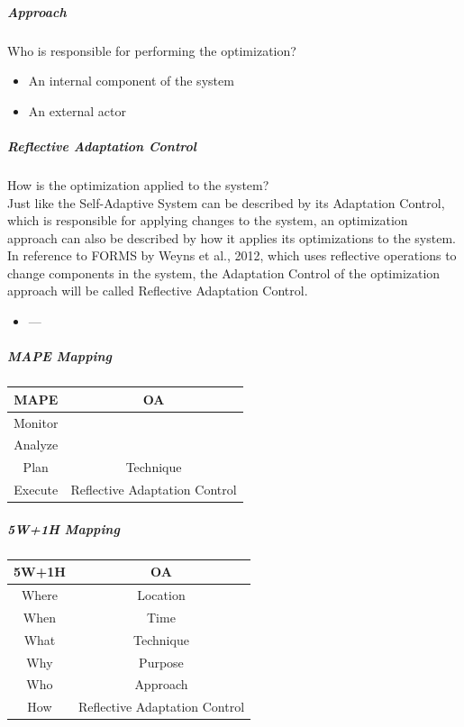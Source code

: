 \subparagraph*{Approach}
Who is responsible for performing the optimization? \\
\begin{itemize}
    \item An internal component of the system
    \item An external actor
\end{itemize}

\subparagraph*{Reflective Adaptation Control}
How is the optimization applied to the system? \\
Just like the Self-Adaptive System can be described by its Adaptation Control,
which is responsible for applying changes to the system,
an optimization approach can also be described by how it applies its optimizations to the system.
In reference to FORMS by Weyns et al., 2012\cite*{FORMS}, which uses reflective operations to change
components in the system, the Adaptation Control of the optimization approach will be called Reflective Adaptation Control.

\begin{itemize}
    \item ---
\end{itemize}

\subparagraph*{MAPE Mapping}
\begin{tabular}{|c|c|}
    \hline
    MAPE & OA \\
    \hline
    Monitor & \\
    \hline
    Analyze & \\
    \hline
    Plan & Technique \\
    \hline
    Execute & Reflective Adaptation Control \\
    \hline
\end{tabular}

\subparagraph*{5W+1H Mapping}
\begin{tabular}{|c|c|}
    \hline
    5W+1H & OA \\
    \hline
    Where & Location\\
    \hline
    When & Time \\
    \hline
    What & Technique \\
    \hline
    Why & Purpose \\
    \hline
    Who & Approach \\ %
    \hline
    How & Reflective Adaptation Control \\
    \hline
\end{tabular}
